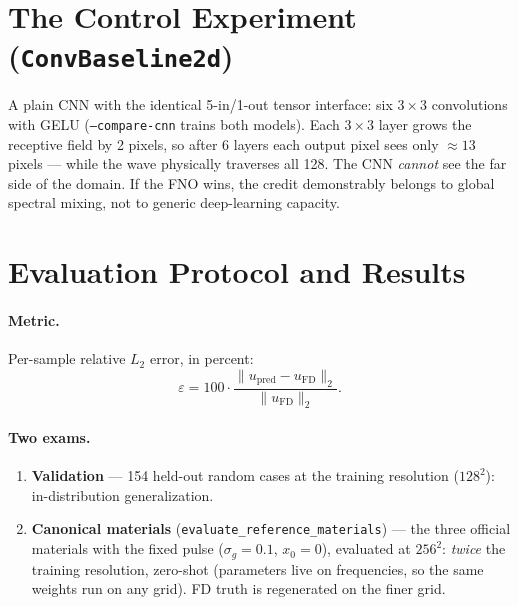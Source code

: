 \documentclass[11pt,a4paper]{article}
\begin{document}
\section{The Control Experiment (\texttt{ConvBaseline2d})}

A plain CNN with the identical 5-in/1-out tensor interface: six $3\times 3$
convolutions with GELU (\texttt{--compare-cnn} trains both models). Each
$3\times 3$ layer grows the receptive field by 2 pixels, so after 6 layers each
output pixel sees only $\approx 13$ pixels --- while the wave physically
traverses all 128. The CNN \emph{cannot} see the far side of the domain.
If the FNO wins, the credit demonstrably belongs to global spectral mixing,
not to generic deep-learning capacity.

\section{Evaluation Protocol and Results}

\paragraph{Metric.} Per-sample relative $L_2$ error, in percent:
\begin{equation}
  \varepsilon = 100 \cdot \frac{\lVert u_{\mathrm{pred}} - u_{\mathrm{FD}} \rVert_2}
                           {\lVert u_{\mathrm{FD}} \rVert_2}.
\end{equation}

\paragraph{Two exams.}
\begin{enumerate}[nosep]
  \item \textbf{Validation} --- 154 held-out random cases at the training
        resolution ($128^2$): in-distribution generalization.
  \item \textbf{Canonical materials} (\texttt{evaluate\_reference\_materials})
        --- the three official materials with the fixed pulse
        ($\sigma_g{=}0.1$, $x_0{=}0$), evaluated at $256^2$: \emph{twice} the
        training resolution, zero-shot (parameters live on frequencies, so the
        same weights run on any grid). FD truth is regenerated on the finer grid.
\end{enumerate}
\end{document}
